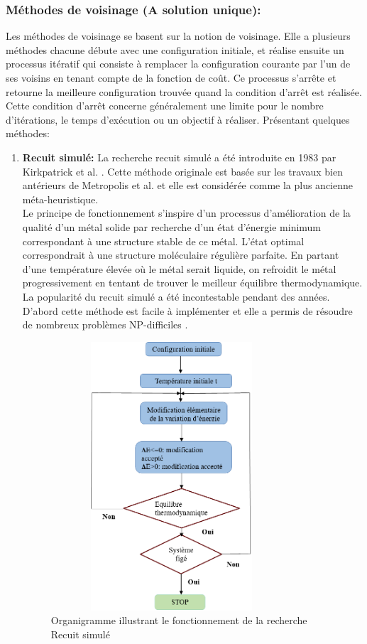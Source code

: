 \subsubsection{Méthodes de voisinage (A solution unique):}
Les méthodes de voisinage se basent sur la notion de voisinage. Elle a plusieurs méthodes chacune débute avec une configuration initiale, et réalise ensuite un processus itératif qui consiste à remplacer la configuration courante par l'un de ses voisins en tenant compte de la fonction de coût. Ce processus s'arrête et retourne la meilleure configuration trouvée quand la condition d'arrêt est réalisée. Cette condition d'arrêt concerne généralement une limite pour le nombre d'itérations, le temps d’exécution ou un objectif à réaliser. Présentant quelques méthodes:

\begin{enumerate}[label=\alph*)]
	\item \textbf{Recuit simulé: } La recherche recuit simulé a été introduite en 1983 par Kirkpatrick et al. \cite{kirkpatrick1983optimization}. Cette méthode originale est basée sur les travaux bien antérieurs de Metropolis et al. \cite{metropolis1953equation} et elle est considérée comme la plus ancienne méta-heuristique.\\
Le principe de fonctionnement s’inspire d’un processus d’amélioration de la qualité d’un métal solide par recherche d’un état d’énergie minimum correspondant à une structure stable de ce métal. L’état optimal correspondrait à une structure moléculaire régulière parfaite. En partant d’une température élevée où le métal serait liquide, on refroidit le métal progressivement en tentant de trouver le meilleur équilibre thermodynamique.\\
La popularité du recuit simulé a été incontestable pendant des années. D’abord cette méthode est facile à implémenter et elle a permis de résoudre de nombreux problèmes NP-difficiles \cite{bonomi1984n,vidal1993applied}.\\
\begin{figure}[h]
	\centering
	\includegraphics[width=9cm,height=10cm]{Chap2/3.png}
	\caption{Organigramme  illustrant le fonctionnement  de la recherche Recuit simulé}
	\label{fig:OIFRR}
\end{figure}


\end{enumerate}
